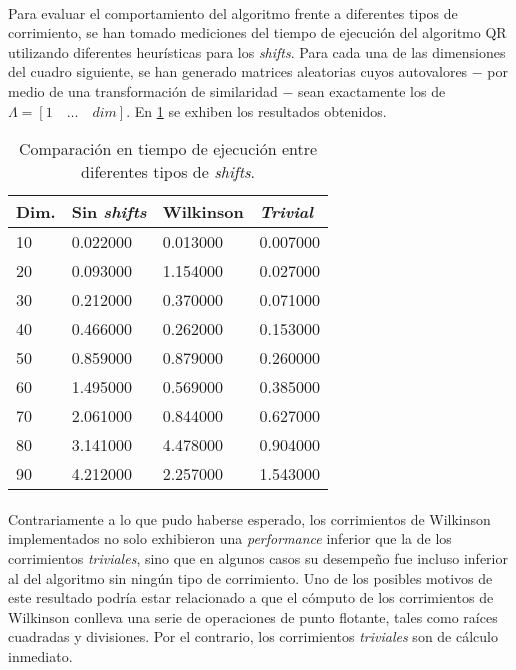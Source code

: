 \documentclass[12pt, twocolumn]{article}
\begin{document}
	\paragraph{} Para evaluar el comportamiento del algoritmo frente a diferentes tipos de corrimiento, se han tomado mediciones del tiempo de ejecución del algoritmo QR utilizando diferentes heurísticas para los \textit{shifts}. Para cada una de las dimensiones del cuadro siguiente, se han generado matrices aleatorias cuyos autovalores $-$ por medio de una transformación de similaridad $-$ sean exactamente los de $ \Lambda = \left[1\quad\dots\quad dim\right]$. En \ref{shcmp} se exhiben los resultados obtenidos.
	\begin{table}[h]
		\centering
		\label{shcmp}
		\begin{tabular}{@{}llll@{}}
			\toprule
			Dim. & Sin \textit{shifts} & Wilkinson & \textit{Trivial}  \\ \midrule
			10   & 0.022000           & 0.013000  & 0.007000 \\
			20   & 0.093000           & 1.154000  & 0.027000 \\
			30   & 0.212000           & 0.370000  & 0.071000 \\
			40   & 0.466000           & 0.262000  & 0.153000 \\
			50   & 0.859000           & 0.879000  & 0.260000 \\
			60   & 1.495000           & 0.569000  & 0.385000 \\
			70   & 2.061000           & 0.844000  & 0.627000 \\
			80   & 3.141000           & 4.478000  & 0.904000 \\
			90   & 4.212000           & 2.257000  & 1.543000 \\ \bottomrule
		\end{tabular}
		\caption{Comparación en tiempo de ejecución entre diferentes tipos de \textit{shifts}.}
	\end{table}
	
	\paragraph{} Contrariamente a lo que pudo haberse esperado, los corrimientos de Wilkinson implementados no solo exhibieron una \textit{performance} inferior que la de los corrimientos \textit{triviales}, sino que en algunos casos su desempeño fue incluso inferior al del algoritmo sin ningún tipo de corrimiento. Uno de los posibles motivos de este resultado podría estar relacionado a que el cómputo de los corrimientos de Wilkinson conlleva una serie de operaciones de punto flotante, tales como raíces cuadradas y divisiones. Por el contrario, los corrimientos \textit{triviales} son de cálculo inmediato.
	
\end{document}
